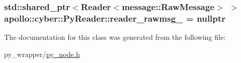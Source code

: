 \hypertarget{classapollo_1_1cyber_1_1PyReader_a314d7f61cb04390baf3cb2cf113b3020}{
\subsubsection[{reader\-\_\-rawmsg\-\_\-}]{\setlength{\rightskip}{0pt plus 5cm}std\-::shared\-\_\-ptr$<${\bf Reader}$<${\bf message\-::\-Raw\-Message}$>$ $>$ apollo\-::cyber\-::\-Py\-Reader\-::reader\-\_\-rawmsg\-\_\- = nullptr\hspace{0.3cm}{\ttfamily [private]}}}\label{classapollo_1_1cyber_1_1PyReader_a314d7f61cb04390baf3cb2cf113b3020}


The documentation for this class was generated from the following file\-:\begin{DoxyCompactItemize}
\item 
py\-\_\-wrapper/\hyperlink{py__node_8h}{py\-\_\-node.\-h}\end{DoxyCompactItemize}
